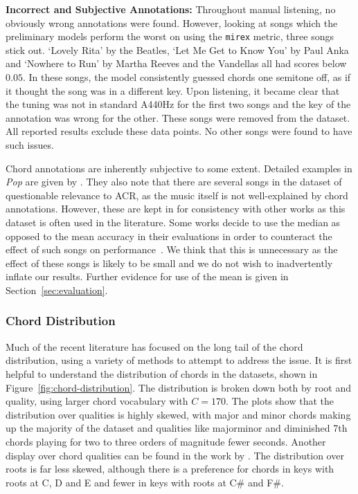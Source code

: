 \textbf{Incorrect and Subjective Annotations:} Throughout manual listening, no obviously wrong annotations were found. However, looking at songs which the preliminary models perform the worst on using the \texttt{mirex} metric, three songs stick out. `Lovely Rita' by the Beatles, `Let Me Get to Know You' by Paul Anka and `Nowhere to Run' by Martha Reeves and the Vandellas all had scores below $0.05$. In these songs, the model consistently guessed chords one semitone off, as if it thought the song was in a different key. Upon listening, it became clear that the tuning was not in standard A440Hz for the first two songs and the key of the annotation was wrong for the other. These songs were removed from the dataset. All reported results exclude these data points. No other songs were found to have such issues.

Chord annotations are inherently subjective to some extent. Detailed examples in \emph{Pop} are given by \citet{FourTimelyInsights}. They also note that there are several songs in the dataset of questionable relevance to ACR, as the music itself is not well-explained by chord annotations. However, these are kept in for consistency with other works as this dataset is often used in the literature. Some works decide to use the median as opposed to the mean accuracy in their evaluations in order to counteract the effect of such songs on performance~\citep{StructuredTraining}. We think that this is unnecessary as the effect of these songs is likely to be small and we do not wish to inadvertently inflate our results. Further evidence for use of the mean is given in Section~\ref{sec:evaluation}.

\subsubsection{Chord Distribution}

Much of the recent literature has focused on the long tail of the chord distribution, using a variety of methods to attempt to address the issue. It is first helpful to understand the distribution of chords in the datasets, shown in Figure~\ref{fig:chord-distribution}. The distribution is broken down both by root and quality, using larger chord vocabulary with $C=170$. The plots show that the distribution over qualities is highly skewed, with major and minor chords making up the majority of the dataset and qualities like majorminor and diminished 7th chords playing for two to three orders of magnitude fewer seconds. Another display over chord qualities can be found in the work by \citet{ACRLargeVocab1}. The distribution over roots is far less skewed, although there is a preference for chords in keys with roots at C, D and E and fewer in keys with roots at C\# and F\#.

